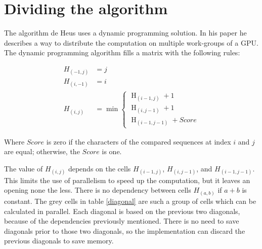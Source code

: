 \section{Dividing the algorithm}
The algorithm de Heus uses a dynamic programming solution\cite{Heus}.
In his paper he describes a way to distribute the computation on multiple work-groups of a GPU.
The dynamic programming algorithm fills a matrix with the following rules\cite{Jordan}:

\begin{equation} \label{eq1}
\begin{split}
H_{(-1,j)} & = j \\
H_{(i,-1)} & = i \\
H_{(i,j)} & = \min \begin{cases}
          \operatorname{H}_{(i-1,j)} + 1 \\
          \operatorname{H}_{(i,j-1)} + 1 \\
          \operatorname{H}_{(i-1,j-1)} + Score
\end{cases}
\end{split}
\end{equation}

Where $Score$ is zero if the characters of the compared sequences at index $i$ and $j$ are equal; otherwise, the $Score$ is one.

The value of $H_{(i,j)}$ depends on the cells $H_{(i-1,j)}$, $H_{(i,j-1)}$, and $H_{(i-1,j-1)}$.
This limits the use of parallelism to speed up the computation, but it leaves an opening none the less.
There is no dependency between cells $H_{(a,b)}$ if $a + b$ is constant.
The grey cells in table \ref{diagonal} are such a group of cells which can be calculated in parallel.
Each diagonal is based on the previous two diagonals, because of the dependencies previously mentioned\cite{Meyers}.
There is no need to save diagonals prior to those two diagonals, so the implementation can discard the previous diagonals to save memory.

